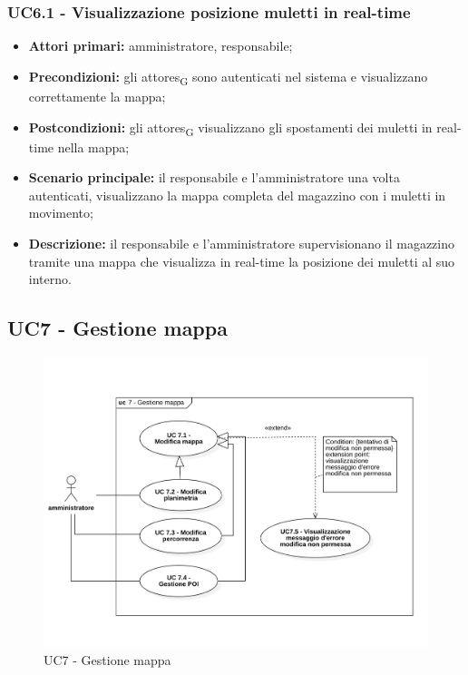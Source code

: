 \subsubsection{UC6.1 - Visualizzazione posizione muletti in real-time}
\begin{itemize}
	\item 	\textbf{Attori primari:} amministratore, responsabile;
	\item 	\textbf{Precondizioni:} gli \glspl{attore}\textsubscript{G} sono autenticati nel sistema e visualizzano correttamente la mappa;
	\item 	\textbf{Postcondizioni:} gli \glspl{attore}\textsubscript{G} visualizzano gli spostamenti dei muletti in real-time nella mappa;
	\item 	\textbf{Scenario principale:} il responsabile e l'amministratore una volta autenticati, visualizzano la mappa completa del magazzino con i muletti in movimento;
	\item 	\textbf{Descrizione:} il responsabile e l'amministratore supervisionano il magazzino tramite una mappa che visualizza in real-time la posizione dei muletti al suo interno.
\end{itemize}

\subsection{UC7 - Gestione mappa}

\begin{figure}[H]
	\centering
	\includegraphics[scale=0.52]{res/images/uc7.png}
	\caption{UC7 - Gestione mappa}
\end{figure}

